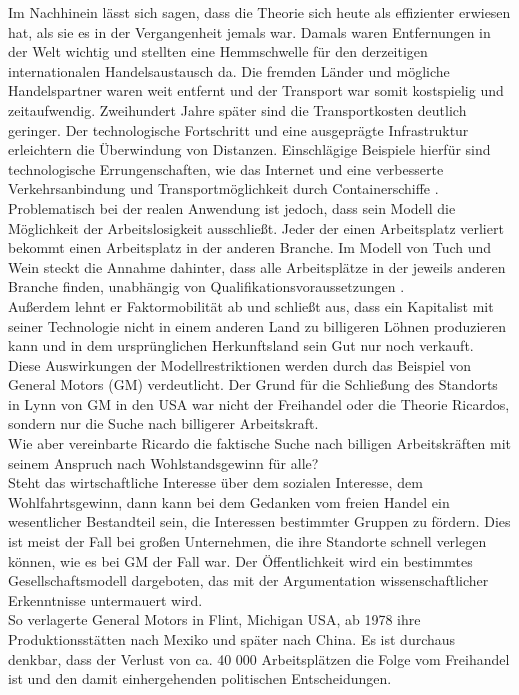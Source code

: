 %
 Im Nachhinein  lässt sich sagen, dass die Theorie sich heute als effizienter erwiesen hat, als sie es in der Vergangenheit jemals war. Damals waren Entfernungen in der Welt wichtig und stellten eine Hemmschwelle für den derzeitigen internationalen Handelsaustausch da. Die fremden Länder und mögliche Handelspartner waren weit entfernt und der Transport war somit kostspielig und zeitaufwendig. Zweihundert Jahre später sind die Transport\-kosten deutlich geringer. Der technologische Fortschritt und eine ausgeprägte Infrastruktur erleichtern die Überwindung von Distanzen. Einschlägige Beispiele hierfür sind technologische Errungenschaften, wie das Internet und eine verbesserte Verkehrsanbindung und Transportmöglichkeit durch Containerschiffe \cite[S. 191-196]{Rosner.2012}. \\
%
 Problematisch bei der realen Anwendung ist jedoch, dass sein Modell die Möglichkeit der Arbeitslosigkeit ausschließt. Jeder der einen Arbeitsplatz verliert bekommt einen Arbeitsplatz in der anderen Branche. Im Modell von Tuch und Wein steckt die Annahme dahinter, dass alle Arbeitsplätze in der jeweils anderen Branche finden, unabhängig von Qualifikationsvoraussetzungen \cite{Ricardo.1817}.\\
%
 Außerdem lehnt er Faktormobilität ab und schließt aus, dass ein Kapitalist mit seiner Technologie nicht in einem anderen Land zu billigeren Löhnen produzieren kann und in dem ursprünglichen Herkunftsland sein Gut nur noch verkauft.\\
%
 Diese Auswirkungen der Modellrestriktionen werden durch das Beispiel von General Motors (GM) verdeutlicht. Der Grund für die Schließung des Standorts in Lynn von GM in den USA war nicht der Freihandel oder die Theorie Ricardos, sondern nur die Suche nach billigerer Arbeitskraft. \\
%
 Wie aber vereinbarte Ricardo die faktische Suche nach billigen Arbeitskräften mit seinem Anspruch nach Wohlstandsgewinn für alle? \\
%
 Steht das wirtschaftliche Interesse über dem sozialen Interesse, dem Wohlfahrtsgewinn, dann kann bei dem Gedanken vom freien Handel ein wesentlicher Bestandteil sein, die Interessen bestimmter Gruppen zu fördern. Dies ist meist der Fall bei großen Unternehmen, die ihre Standorte schnell verlegen können, wie es bei GM der Fall war. Der Öffentlichkeit wird ein bestimmtes Gesellschaftsmodell dargeboten, das mit der Argumentation wissenschaftlicher Erkenntnisse untermauert wird.\\ 
%
So verlagerte General Motors in Flint, Michigan USA, ab 1978 ihre Produktionsstätten nach Mexiko und später nach China. Es ist durchaus denkbar, dass der Verlust von ca. 40 000 Arbeitsplätzen die Folge vom Freihandel ist und den damit einhergehenden politischen Entscheidungen.\\
